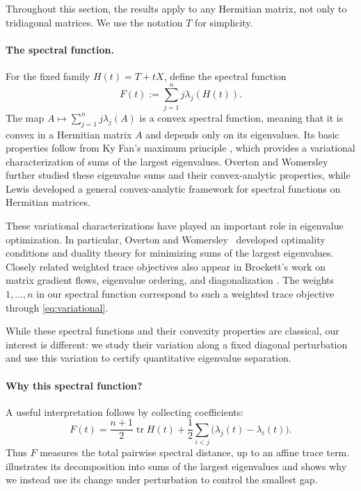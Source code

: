 \documentclass[10pt,a4paper]{article}
\DeclareMathOperator{\tr}{tr}
\begin{document}
Throughout this section, the results apply to any Hermitian matrix, not only to tridiagonal matrices. We use the notation $T$ for simplicity. 

\paragraph{The spectral function.}
For the fixed family $H(t)=T+tX$, define the spectral function
\begin{equation}\label{eq:F}
\boxed{F(t):=\sum_{j=1}^n j\lambda_j(H(t)).}
\end{equation}
The map $A\mapsto\sum_{j=1}^n j\lambda_j(A)$ is a convex
spectral function, meaning that it is convex in a Hermitian
matrix $A$ and depends only on its eigenvalues.
Its basic properties follow from Ky Fan's maximum principle
\cite{Fan1949}, which provides a variational characterization
of sums of the largest eigenvalues. Overton and Womersley
\cite{OvertonWomersley1992} further studied these eigenvalue
sums and their convex-analytic properties, while Lewis
\cite{Lewis1996Convex} developed a general convex-analytic
framework for spectral functions on Hermitian matrices.


These variational characterizations have played an
important role in eigenvalue optimization. In particular,
Overton and Womersley~\cite{OvertonWomersley1993}
developed optimality conditions and duality theory
for minimizing sums of the largest eigenvalues.
Closely related weighted trace objectives also appear
in Brockett's work on matrix gradient flows,
eigenvalue ordering, and diagonalization
\cite{Brockett1991}. The weights $1,\ldots,n$
in our spectral function correspond to such a
weighted trace objective through \eqref{eq:variational}.



While these spectral functions and their convexity
properties are classical, our interest is different:
we study their variation along a fixed diagonal
perturbation and use this variation to certify
quantitative eigenvalue separation.


\paragraph{Why this spectral function?}
A useful interpretation follows by collecting coefficients:
\begin{equation}\label{eq:pairwise-spread}
\boxed{F(t)=\frac{n+1}{2}\tr H(t)
+\frac12\sum_{i<j}\bigl(\lambda_j(t)-\lambda_i(t)\bigr).}
\end{equation}
Thus $F$ measures the total pairwise spectral distance,
up to an affine trace term.  illustrates its
decomposition into sums of the largest eigenvalues and shows
why we instead use its change under perturbation to control
the smallest gap.
\end{document}
